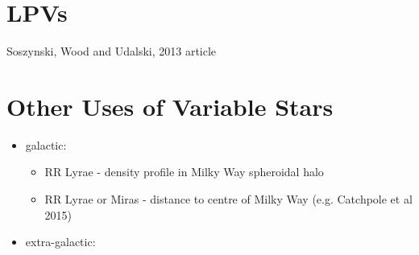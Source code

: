\documentclass{spy}
\begin{document}
\section{LPVs}
Soszynski, Wood and Udalski, 2013 article


\section{Other Uses of Variable Stars}
\begin{itemize}
    \item galactic:
       \begin{itemize}
        \item RR Lyrae - density profile in Milky Way spheroidal halo
        \item RR Lyrae or Miras - distance to centre of Milky Way (e.g. Catchpole et al 2015)
       \end{itemize}
    \item extra-galactic:
\end{itemize}



\end{document}

